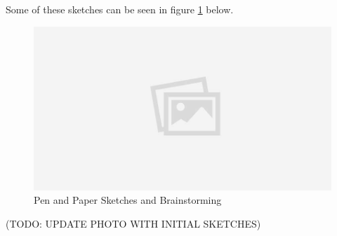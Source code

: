 \documentclass[12pt]{article}
\begin{document}
	Some of these sketches can be seen in figure \ref{fig:sketches} below.
	\begin{figure}[H]
		\centering
		\includegraphics[scale=0.3]{images/placeholder.jpg}
		\caption{Pen and Paper Sketches and Brainstorming}
		\label{fig:sketches}
	\end{figure}
	(TODO: UPDATE PHOTO WITH INITIAL SKETCHES)
	
\end{document}
